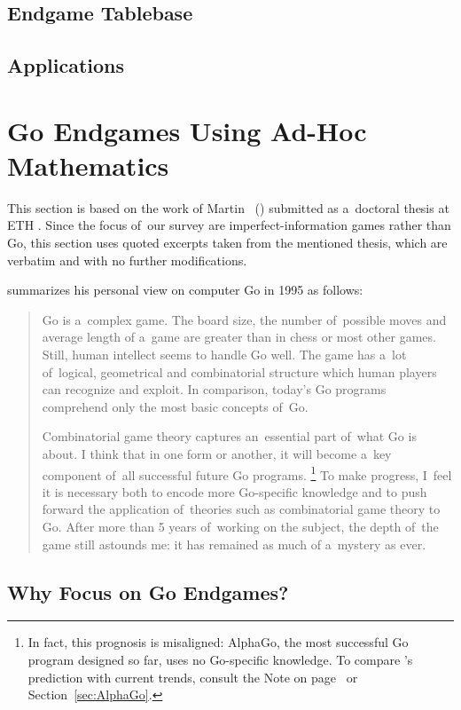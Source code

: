 \subsection{Endgame Tablebase}
\todo

\subsection{Applications}
\todo

\section{Go Endgames Using Ad-Hoc Mathematics}

This section is based on the work of Martin~\Mueller{} (\cite{Muller1995computer}) submitted as a~doctoral thesis at ETH \Zurich.
Since the focus of~our survey are imperfect-information games rather than Go, this section uses quoted excerpts taken from the mentioned thesis, which are verbatim and with no further modifications.

\Mueller{} summarizes his personal view on computer Go in 1995 as follows:
\begin{quotation}
  Go is a~complex game.
  The board size, the number of~possible moves and average length of a~game are greater than in chess or most other games.
  Still, human intellect seems to handle Go well.
  The game has a~lot of~logical, geometrical and combinatorial structure which human players can recognize and exploit.
  In comparison, today’s Go programs comprehend only the most basic concepts of~Go.

  Combinatorial game theory captures an~essential part of~what Go is about.
  I think that in one form or another, it will become a~key component of~all successful future Go programs.%
  \footnote{
    In fact, this prognosis is misaligned:
    AlphaGo, the most successful Go program designed so far, uses no Go-specific knowledge.
    To compare \Mueller's prediction with current trends, consult the Note on page~\pageref{note:CGTvsAlphaGo} or Section~\ref{sec:AlphaGo}.
  }
  To make progress, I~feel it is necessary both to encode more Go-specific knowledge and to push forward the application of~theories such as combinatorial game theory to Go.
  After more than 5 years of~working on the subject, the depth of~the game still astounds me:
  it has remained as much of a~mystery as ever.
\end{quotation}

\subsection{Why Focus on Go Endgames?}

